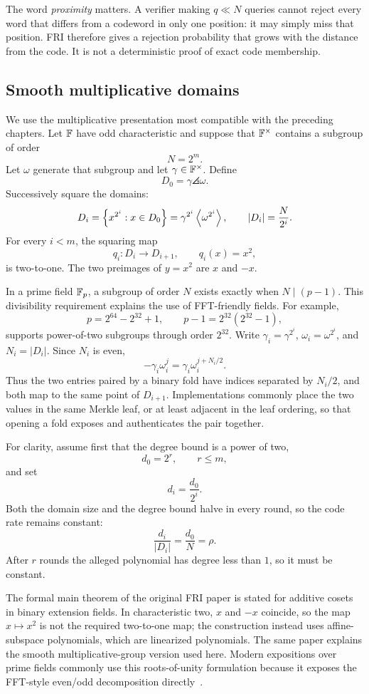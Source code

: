 The word \emph{proximity} matters. A verifier making $q\ll N$ queries cannot reject every
word that differs from a codeword in only one position: it may simply miss that position.
FRI therefore gives a rejection probability that grows with the distance from the code. It is
not a deterministic proof of exact code membership.

\subsection{Smooth multiplicative domains}

We use the multiplicative presentation most compatible with the preceding chapters. Let
$\mathbb{F}$ have odd characteristic and suppose that $\mathbb{F}^\times$ contains a subgroup of order
\[
    N=2^m.
\]
Let $\omega$ generate that subgroup and let $\gamma\in\mathbb{F}^\times$. Define
\[
    D_0=\gamma\angles{\omega}.
\]
Successively square the domains:
\[
    D_i
    =\left\{x^{2^i}:x\in D_0\right\}
    =\gamma^{2^i}\left\langle \omega^{2^i}\right\rangle,
    \qquad
    |D_i|=\frac{N}{2^i}.
\]
For every $i<m$, the squaring map
\[
    q_i:D_i\to D_{i+1},
    \qquad
    q_i(x)=x^2,
\]
is two-to-one. The two preimages of $y=x^2$ are $x$ and $-x$.

In a prime field $\mathbb{F}_p$, a subgroup of order $N$ exists exactly when $N\mid(p-1)$. This
divisibility requirement explains the use of FFT-friendly fields. For example,
\[
    p=2^{64}-2^{32}+1,
    \qquad
    p-1=2^{32}(2^{32}-1),
\]
supports power-of-two subgroups through order $2^{32}$. Write
$\gamma_i=\gamma^{2^i}$, $\omega_i=\omega^{2^i}$, and $N_i=|D_i|$. Since $N_i$ is even,
\[
    -\gamma_i\omega_i^j=\gamma_i\omega_i^{j+N_i/2}.
\]
Thus the two entries paired by a binary fold have indices separated by $N_i/2$, and both map
to the same point of $D_{i+1}$. Implementations commonly place the two values in the same
Merkle leaf, or at least adjacent in the leaf ordering, so that opening a fold exposes and
authenticates the pair together.

For clarity, assume first that the degree bound is a power of two,
\[
    d_0=2^r,
    \qquad r\le m,
\]
and set
\[
    d_i=\frac{d_0}{2^i}.
\]
Both the domain size and the degree bound halve in every round, so the code rate remains
constant:
\[
    \frac{d_i}{|D_i|}=\frac{d_0}{N}=\rho.
\]
After $r$ rounds the alleged polynomial has degree less than $1$, so it must be constant.

\begin{remark}
The formal main theorem of the original FRI paper is stated for additive cosets in binary
extension fields. In characteristic two, $x$ and $-x$ coincide, so the map $x\mapsto x^2$
is not the required two-to-one map; the construction instead uses affine-subspace
polynomials, which are linearized polynomials. The same paper explains the smooth
multiplicative-group version used here. Modern expositions over prime fields commonly use
this roots-of-unity formulation because it exposes the FFT-style even/odd decomposition
directly~\cite{BenSassonBentovHoreshRiabzev2018FRI}.
\end{remark}

